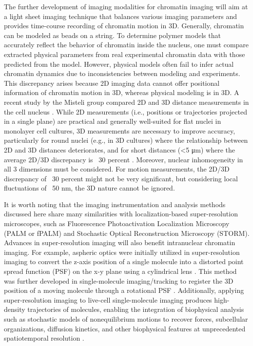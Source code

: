The further development of imaging modalities for chromatin imaging will aim at a light sheet imaging technique that balances various imaging parameters and provides time-course recording of chromatin motion in 3D. Generally, chromatin can be modeled as beads on a string. To determine polymer models that accurately reflect the behavior of chromatin inside the nucleus, one must compare extracted physical parameters from real experimental chromatin data with those predicted from the model. However, physical models often fail to infer actual chromatin dynamics due to inconsistencies between modeling and experiments. This discrepancy arises because 2D imaging data cannot offer positional information of chromatin motion in 3D, whereas physical modeling is in 3D. A recent study by the Misteli group compared 2D and 3D distance measurements in the cell nucleus \parencite{Finn2017}. While 2D measurements (i.e., positions or trajectories projected in a single plane) are practical and generally well-suited for flat nuclei in monolayer cell cultures, 3D measurements are necessary to improve accuracy, particularly for round nuclei (e.g., in 3D cultures) where the relationship between 2D and 3D distances deteriorates, and for short distances (<5 μm) where the average 2D/3D discrepancy is ~30 percent \parencite{Finn2017}. Moreover, nuclear inhomogeneity in all 3 dimensions must be considered. For motion measurements, the 2D/3D discrepancy of ~30 percent might not be very significant, but considering local fluctuations of ~50 nm, the 3D nature cannot be ignored.

It is worth noting that the imaging instrumentation and analysis methods discussed here share many similarities with localization-based super-resolution microscopes, such as Fluorescence Photoactivation Localization Microscopy (PALM or fPALM) and Stochastic Optical Reconstruction Microscopy (STORM). Advances in super-resolution imaging will also benefit intranuclear chromatin imaging. For example, aspheric optics were initially utilized in super-resolution imaging to convert the z-axis position of a single molecule into a distorted point spread function (PSF) on the x-y plane using a cylindrical lens \parencite{Huang2008}. This method was further developed in single-molecule imaging/tracking to register the 3D position of a moving molecule through a rotational PSF \parencite{Greengard2006,Pavani2009,Badieirostami2010,Thompson2010}. Additionally, applying super-resolution imaging to live-cell single-molecule imaging produces high-density trajectories of molecules, enabling the integration of biophysical analysis such as stochastic models of nonequilibrium motions to recover forces, subcellular organizations, diffusion kinetics, and other biophysical features at unprecedented spatiotemporal resolution \parencite{Hoze2012,Holcman2015,Hoze2015}.

